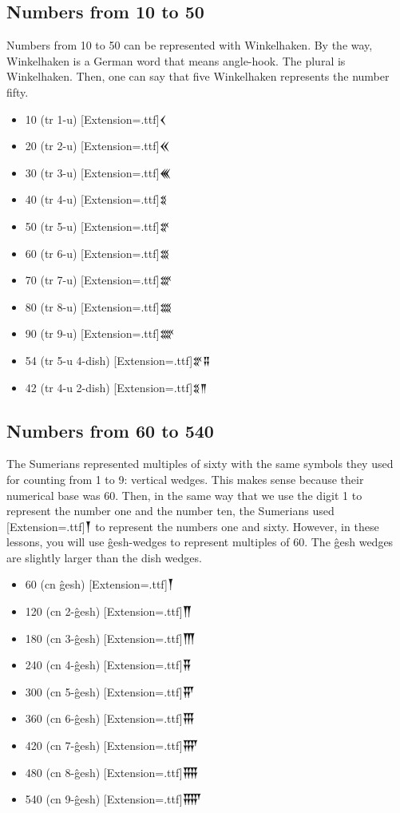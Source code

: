 \documentclass[a4paper,12pt]{book}
\newcommand{\fcn}{\setmainfont{Akkadian}[Extension=.ttf]}
\newcommand{\fcm}{\large\setmainfont{Akkadian}[Extension=.ttf]}
\begin{document}
\newpage
\subsection*{Numbers from 10 to 50}
Numbers from 10 to 50 can be represented
with Winkelhaken. By the way, Winkelhaken
is a German word that means angle-hook.
The plural is Winkelhaken. Then, one can
say that five Winkelhaken represents
the number fifty.

\begin{itemize}
\item 10 (tr 1-u) {\fcm 𒌋} 
\item 20 (tr 2-u) {\fcm  𒎙} 
\item 30 (tr 3-u) {\fcm 𒌍} 
\item 40 (tr 4-u) {\fcm 𒐏} 
\item 50 (tr 5-u) {\fcm  𒐐} 
\item 60 (tr 6-u) {\fcm 𒐑} 
\item 70 (tr 7-u) {\fcm 𒐒} 
\item 80 (tr 8-u) {\fcm 𒐓} 
\item 90 (tr 9-u) {\fcm 𒐔} 
\item 54 (tr 5-u 4-dish) {\fcm 𒐐𒐉} 
\item 42 (tr 4-u 2-dish) {\fcm 𒐏𒈫} 
\end{itemize}

\newpage
\subsection*{Numbers from 60 to 540}
The Sumerians represented multiples of
sixty with the same symbols they used
for counting from 1 to 9: vertical wedges.
This makes sense because their numerical
base was 60. Then, in the same way that
we use the digit 1 to represent
the number one and the number ten,
the Sumerians used {\fcn 𒐕}  to represent
the numbers one and sixty. However, in
these lessons, you will use ĝesh-wedges
to represent multiples of 60. The ĝesh wedges
are slightly larger than the dish wedges.
\begin{itemize}
\item 60 (cn ĝesh) {\fcm 𒐕} 
\item 120 (cn 2-ĝesh) {\fcm 𒐖} 
\item 180 (cn 3-ĝesh) {\fcm 𒐗} 
\item 240 (cn 4-ĝesh) {\fcm 𒐘} 
\item 300 (cn 5-ĝesh) {\fcm 𒐙} 
\item 360 (cn 6-ĝesh) {\fcm 𒐚} 
\item 420 (cn 7-ĝesh) {\fcm 𒐛}
\item 480 (cn 8-ĝesh) {\fcm 𒐜}
\item 540 (cn 9-ĝesh) {\fcm 𒐝} 
\end{itemize}
\end{document}
